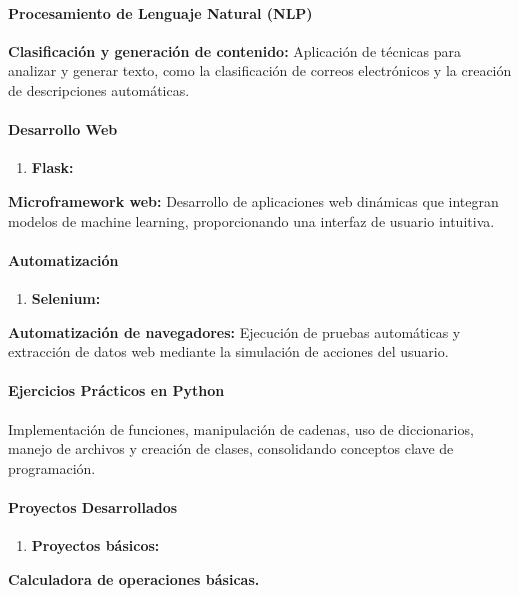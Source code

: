 \documentclass[letterpaper]{article}
\newcommand\textstyleStrong[1]{\textbf{#1}}
\begin{document}
\paragraph{Procesamiento de Lenguaje Natural (NLP)}
{
\textstyleStrong{Clasificación y generación de contenido:} Aplicación de técnicas para analizar y generar texto, como la
clasificación de correos electrónicos y la creación de descripciones automáticas.}

\paragraph{Desarrollo Web}
\begin{enumerate}[series=listWWNumvii,label=\arabic*.,ref=\arabic*]
\item {
\textstyleStrong{Flask:}}
\end{enumerate}
{
\textstyleStrong{Microframework web:} Desarrollo de aplicaciones web dinámicas que integran modelos de machine learning,
proporcionando una interfaz de usuario intuitiva.}

\paragraph{Automatización}
\begin{enumerate}[series=listWWNumviii,label=\arabic*.,ref=\arabic*]
\item {
\textstyleStrong{Selenium:}}
\end{enumerate}
{
\textstyleStrong{Automatización de navegadores:} Ejecución de pruebas automáticas y extracción de datos web mediante la
simulación de acciones del usuario.}

\paragraph{Ejercicios Prácticos en Python}
{
Implementación de funciones, manipulación de cadenas, uso de diccionarios, manejo de archivos y creación de clases,
consolidando conceptos clave de programación.}

\paragraph{Proyectos Desarrollados}
\begin{enumerate}[series=listWWNumx,label=\arabic*.,ref=\arabic*]
\item {
\textstyleStrong{Proyectos básicos:}}
\end{enumerate}
{
\textstyleStrong{\textmd{Calculadora de operaciones básicas.}}}
\end{document}
